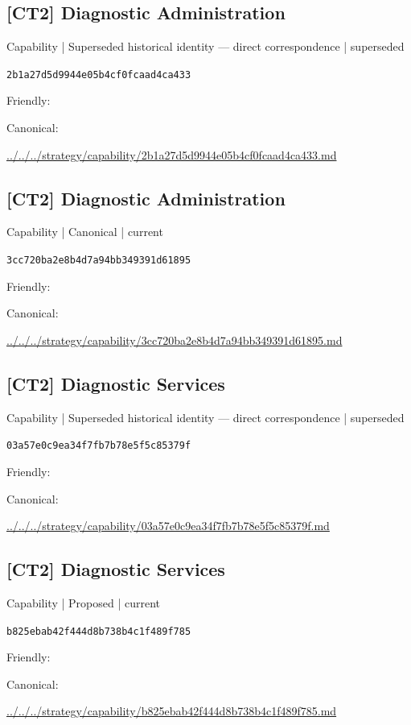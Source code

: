 \documentclass[10pt,a4paper]{article}
\begin{document}
\subsection*{[CT2] Diagnostic Administration}
{\small Capability | Superseded historical identity — direct correspondence | superseded}\par
\texttt{2b1a27d5d9944e05b4cf0fcaad4ca433}\par
Friendly: \par
Canonical: \par
{\footnotesize\url{../../../strategy/capability/2b1a27d5d9944e05b4cf0fcaad4ca433.md}}\par
\subsection*{[CT2] Diagnostic Administration}
{\small Capability | Canonical | current}\par
\texttt{3cc720ba2e8b4d7a94bb349391d61895}\par
Friendly: \par
Canonical: \par
{\footnotesize\url{../../../strategy/capability/3cc720ba2e8b4d7a94bb349391d61895.md}}\par
\subsection*{[CT2] Diagnostic Services}
{\small Capability | Superseded historical identity — direct correspondence | superseded}\par
\texttt{03a57e0c9ea34f7fb7b78e5f5c85379f}\par
Friendly: \par
Canonical: \par
{\footnotesize\url{../../../strategy/capability/03a57e0c9ea34f7fb7b78e5f5c85379f.md}}\par
\subsection*{[CT2] Diagnostic Services}
{\small Capability | Proposed | current}\par
\texttt{b825ebab42f444d8b738b4c1f489f785}\par
Friendly: \par
Canonical: \par
{\footnotesize\url{../../../strategy/capability/b825ebab42f444d8b738b4c1f489f785.md}}\par
\end{document}
